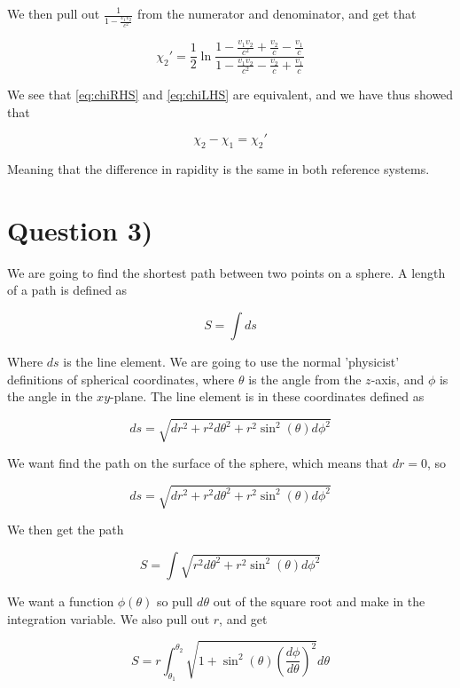 \documentclass[a4paper,norsk, 10pt]{article}
\begin{document}
We then pull out $\frac{1}{1 -\frac{v_1v_2}{c^2}}$ from the numerator and denominator, and get that

\begin{equation}
\chi_2' =\frac{1}{2}\ln \frac{1 -\frac{v_1v_2}{c^2} + \frac{v_2}{c} - \frac{v_1}{c}}{1 -\frac{v_1v_2}{c^2}-\frac{v_2}{c} + \frac{v_1}{c}}
\label{eq:chiLHS}
\end{equation}

We see that \eqref{eq:chiRHS} and \eqref{eq:chiLHS} are equivalent, and we have thus showed that

$$
\chi_2 - \chi_1 = \chi_2'
$$

Meaning that the difference in rapidity is the same in both reference systems.

\section{Question 3)}

We are going to find the shortest path between two points on a sphere. A length of a path is defined as

\begin{equation}
S = \int ds
\end{equation}

Where $ds$ is the line element. We are going to use the normal 'physicist' definitions of spherical coordinates, where $\theta$ is the angle from the $z$-axis, and $\phi$ is the angle in the $xy$-plane. The line element is in these coordinates defined as

$$
ds = \sqrt{dr^2 + r^2 d \theta^2 + r^2\sin^2(\theta) d\phi^2}
$$

We want find the path on the surface of the sphere, which means that $dr = 0$, so

\begin{equation}
ds = \sqrt{dr^2 + r^2 d \theta^2 + r^2\sin^2(\theta) d\phi^2}
\end{equation}


We then get the path

$$
S = \int \sqrt{ r^2 d \theta^2 + r^2\sin^2(\theta) d\phi^2}
$$

We want a function $\phi(\theta)$ so pull $d\theta$ out of the square root and make in the integration variable. We also pull out $r$, and get

\begin{equation}
S = r \int_{\theta_1}^{\theta_2} \sqrt{ 1 + \sin^2(\theta) \left(\frac{d\phi}{d\theta}\right)^2} d\theta
\end{equation}
\end{document}
